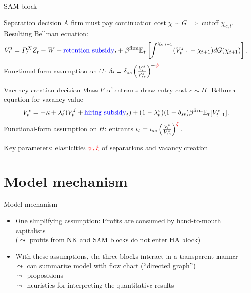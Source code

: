 \documentclass[aspectratio=169]{beamer}
\begin{document}
\begin{frame}{SAM block}
	\begin{block}{Separation decision}
		A firm must pay continuation cost $\chi\sim G$ $\Rightarrow$ cutoff $\chi_{c,t}$. Resulting Bellman equation:
	\begin{align*}
		V_{t}^{j}	=P_{t}^{X}Z_{t}-W+\text{\color{blue}retention subsidy}_{t}+\beta^{\text{firm}}\mathbb{E}_{t}\left[\int^{\chi_{c,t+1}}(V_{t+1}^{j}-\chi_{t+1})dG(\chi_{t+1})\right].
	\end{align*}
	Functional-form assumption on $G$: $\delta_{t}=\delta_{ss}\left(\frac{V_{t}^{j}}{V_{ss}^{j}}\right)^{-{\color{red}\psi}}$.
	\end{block}

	\begin{block}{Vacancy-creation decision}
	Mass $F$ of entrants draw entry cost $c\sim H$. Bellman equation for vacancy value:
		\begin{align*}
 			V_{t}^{v}=-\kappa+\lambda_{t}^{v}(V_{t}^{j}+\text{\color{blue}hiring subsidy}_{t})+(1-\lambda_{t}^{v})(1-\delta_{ss})\beta^{\text{firm}}\mathbb{E}_{t}[V_{t+1}^{v}].
 		\end{align*}
 Functional-form assumption on $H$: entrants $\iota_{t}=\iota_{ss}\left(\frac{V_{t}^{v}}{V_{ss}^{v}}\right)^{\color{red}\xi}.$
	\end{block}

\medskip
Key parameters: elasticities $\color{red} \psi, \xi$ of separations and vacancy creation
\end{frame}

\section{Model mechanism}

\begin{frame}{Model mechanism}
	\begin{itemize}
		\item One simplifying assumption: Profits are consumed by hand-to-mouth capitalists \\ ($\leadsto$ profits from NK and SAM blocks do not enter HA block)
		\item With these assumptions, the three blocks interact in a transparent manner \\ $\leadsto$ can summarize model with flow chart (``directed graph'') \\ $\leadsto$ propositions \\ $\leadsto$ heuristics for interpreting the quantitative results
	\end{itemize}
\end{frame}
\end{document}

